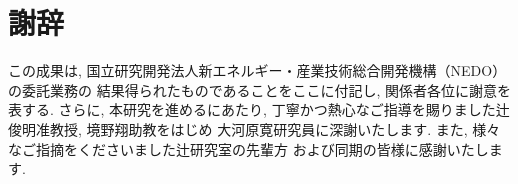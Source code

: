 \section*{謝辞}
この成果は, 国立研究開発法人新エネルギー・産業技術総合開発機構（NEDO）の委託業務の
結果得られたものであることをここに付記し, 関係者各位に謝意を表する. 
さらに, 本研究を進めるにあたり, 丁寧かつ熱心なご指導を賜りました辻俊明准教授, 境野翔助教をはじめ
大河原寛研究員に深謝いたします. また, 様々なご指摘をくださいました辻研究室の先輩方
および同期の皆様に感謝いたします. 